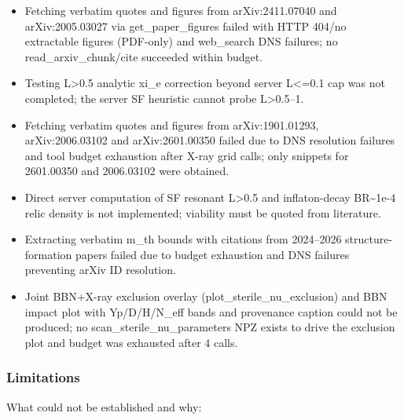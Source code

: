 \documentclass[11pt,a4paper]{article}
\begin{document}
\begin{itemize}
  \item Fetching verbatim quotes and figures from arXiv:2411.07040 and arXiv:2005.03027 via get\_paper\_figures failed with HTTP 404/no extractable figures (PDF-only) and web\_search DNS failures; no read\_arxiv\_chunk/cite succeeded within budget.
  \item Testing L\textgreater{}0.5 analytic xi\_e correction beyond server L\textless{}=0.1 cap was not completed; the server SF heuristic cannot probe L\textgreater{}0.5--1.
  \item Fetching verbatim quotes and figures from arXiv:1901.01293, arXiv:2006.03102 and arXiv:2601.00350 failed due to DNS resolution failures and tool budget exhaustion after X-ray grid calls; only snippets for 2601.00350 and 2006.03102 were obtained.
  \item Direct server computation of SF resonant L\textgreater{}0.5 and inflaton-decay BR\textasciitilde{}1e-4 relic density is not implemented; viability must be quoted from literature.
  \item Extracting verbatim m\_th bounds with citations from 2024--2026 structure-formation papers failed due to budget exhaustion and DNS failures preventing arXiv ID resolution.
  \item Joint BBN+X-ray exclusion overlay (plot\_sterile\_nu\_exclusion) and BBN impact plot with Yp/D/H/N\_eff bands and provenance caption could not be produced; no scan\_sterile\_nu\_parameters NPZ exists to drive the exclusion plot and budget was exhausted after 4 calls.
\end{itemize}
\subsubsection*{Limitations}
What could not be established and why:
\end{document}
